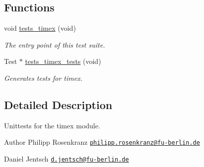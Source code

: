 \subsection*{Functions}
\begin{DoxyCompactItemize}
\item 
void \hyperlink{group__unittests_gad66683ae3365683aba4d469e07ce6799}{tests\+\_\+timex} (void)
\begin{DoxyCompactList}\small\item\em The entry point of this test suite. \end{DoxyCompactList}\item 
Test $\ast$ \hyperlink{group__unittests_ga8e6c61c50f2b2580f16effebba8a7e83}{tests\+\_\+timex\+\_\+tests} (void)
\begin{DoxyCompactList}\small\item\em Generates tests for timex. \end{DoxyCompactList}\end{DoxyCompactItemize}


\subsection{Detailed Description}
Unittests for the {\ttfamily timex} module. 

\begin{DoxyAuthor}{Author}
Philipp Rosenkranz \href{mailto:philipp.rosenkranz@fu-berlin.de}{\tt philipp.\+rosenkranz@fu-\/berlin.\+de} 

Daniel Jentsch \href{mailto:d.jentsch@fu-berlin.de}{\tt d.\+jentsch@fu-\/berlin.\+de} 
\end{DoxyAuthor}
